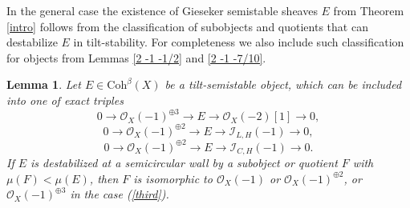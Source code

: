 \documentclass{amsart}
\newtheorem{lemma}[theorem]{Lemma}
\begin{document}
In the general case the existence of Gieseker semistable sheaves $E$ from Theorem \ref{intro} follows from the classification of subobjects and quotients that can destabilize $E$ in tilt-stability. For completeness we also include such classification for objects from Lemmas \ref{2 -1 -1/2} and \ref{2 -1 -7/10}.

\begin{lemma}\label{Jordan-Holder}Let $E\in\mathrm{Coh}^\beta(X)$ be a tilt-semistable object, which can be included into one of exact triples
	\begin{equation}\label{third}0\to \mathcal O_X(-1)^{\oplus 3}\to E\to\mathcal O_X(-2)[1]\to 0,\end{equation}
		\begin{equation}\label{first}0\to \mathcal O_X(-1)^{\oplus 2}\to E\to\mathcal I_{L,H}(-1)\to 0,\end{equation}
		\begin{equation}\label{second}0\to \mathcal O_X(-1)^{\oplus 2}\to E\to\mathcal I_{C,H}(-1)\to 0.\end{equation}
If $E$ is destabilized at a semicircular wall by a subobject or quotient $F$ with $\mu(F)<\mu(E)$, then $F$ is isomorphic to $\mathcal O_X(-1)$ or $\mathcal O_X(-1)^{\oplus 2}$, or $\mathcal O_X(-1)^{\oplus 3}$ in the case (\ref{third}).
\end{lemma}
\end{document}
